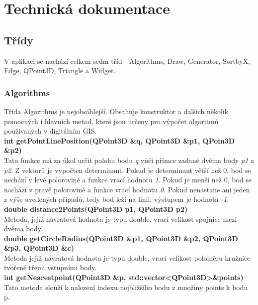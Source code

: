 \documentclass[a4paper,11pt,twoside]{article}
\begin{document}
\vspace*{-1cm}
\section{Technická dokumentace}

\subsection{Třídy}
V aplikaci se nachází celkem sedm tříd - Algorithms, Draw, Generator, SortbyX, Edge, QPoint3D, Triangle a Widget. 

\subsubsection{Algorithms}
Třída Algorithms je nejobsáhlejší. Obsahuje konstruktor a dalšich několik pomocných i hlavních metod, které jsou určeny pro výpočet algoritmů používaných v digitálním GIS. \\

\noindent\textbf{int getPointLinePosition(QPoint3D \&q, QPoint3D \&p1, QPoin3D \&p2)}\\
Tato funkce má za úkol určit polohu bodu \textit{q} vůči přímce zadané dvěma body \textit{p1} a \textit{p2}. Z vektorů je vypočten determinant. Pokud je determinant větší než 0, bod se nechází v levé polorovině a funkce vrací hodnotu \textit{1}. Pokud je menší než 0, bod se nachází v pravé polorovině a funkce vrací hodnotu \textit{0}.  Pokud nenastane ani jeden z výše uvedených případů, tedy bod leží na linii, výstupem je hodnota \textit{-1}.\\

\noindent\textbf{double distance2Points(QPoint3D p1, QPoint3D p2)}\\
Metoda, jejíž návratová hodnota je typu double, vrací velikost spojnice mezi dvěma body.\\

\noindent\textbf{double getCircleRadius(QPoint3D \&p1, QPoint3D \&p2, QPoint3D \&p3, QPoint3D \&c)}\\
Metoda jejíž návratová hodnota je typu double, vrací velikost poloměru kružnice tvořené třemi vstupními body.\\

\noindent\textbf{int getNearestpoint(QPoint3D \&p, std::vector\textless QPoint3D\textgreater \&points)}\\
Tato metoda slouží k nalezení indexu nejbližšího bodu z množiny points k bodu p.\\
\end{document}
